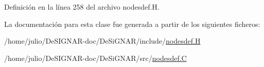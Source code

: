 Definición en la línea 258 del archivo nodesdef.\+H.



La documentación para esta clase fue generada a partir de los siguientes ficheros\+:\begin{DoxyCompactItemize}
\item 
/home/julio/\+De\+S\+I\+G\+N\+A\+R-\/doc/\+De\+Si\+G\+N\+A\+R/include/\hyperlink{nodesdef_8_h}{nodesdef.\+H}\item 
/home/julio/\+De\+S\+I\+G\+N\+A\+R-\/doc/\+De\+Si\+G\+N\+A\+R/src/\hyperlink{nodesdef_8_c}{nodesdef.\+C}\end{DoxyCompactItemize}
